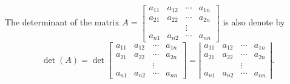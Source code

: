 \documentclass[11pt]{article}
\theoremstyle{definition}
\theoremstyle{plain}
\begin{document}
The determinant of the matrix \( A=\left[\begin{array}{cccc} a_{11}& a_{12}&\cdots&a_{1n}\\a_{21}&a_{22}&\cdots&a_{2n}\\ & &\vdots&\\ a_{n1}&a_{n2}&\cdots&a_{nn}\end{array}\right]\) is also denote by \[\det(A)=\det\left[\begin{array}{cccc} a_{11}& a_{12}&\cdots&a_{1n}\\a_{21}&a_{22}&\cdots&a_{2n}\\ & &\vdots&\\ a_{n1}&a_{n2}&\cdots&a_{nn}\end{array}\right]=\left|\begin{array}{cccc} a_{11}& a_{12}&\cdots&a_{1n}\\a_{21}&a_{22}&\cdots&a_{2n}\\ & &\vdots&\\ a_{n1}&a_{n2}&\cdots&a_{nn}\end{array}\right|. \]
\end{document}
